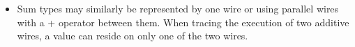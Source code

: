 \documentclass[preprint]{sigplanconf}
\begin{document}
\begin{itemize}
\item Sum types may similarly be represented by one wire or using
  parallel wires with a {{+}} operator between them. When tracing the
  execution of two additive wires, a value can reside on only one of the two
  wires.
\begin{multicols}{2}
\begin{center}
\end{center}
\begin{center}
\end{center}
\end{multicols}
\begin{multicols}{2}
\begin{center}
\end{center}
\begin{center}
\end{center}
\end{multicols}





\end{itemize}
\end{document}
